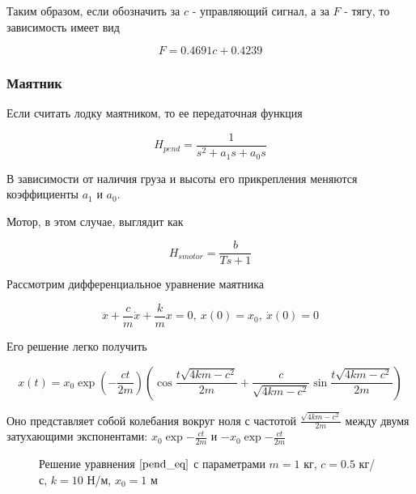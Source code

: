\documentclass[12pt,a4paper]{article}
\begin{document}
Таким образом, если обозначить за $c$ - управляющий сигнал, а за $F$ - тягу, то зависимость имеет вид

$$ F = 0.4691c + 0.4239 $$


\subsubsection{Маятник}

Если считать лодку маятником, то ее передаточная функция

$$ H_{pend} = \frac{1}{s^2 + a_1s + a_0s} $$

В зависимости от наличия груза и высоты его прикрепления меняются коэффициенты $a_1$ и $a_0$.

Мотор, в этом случае, выглядит как

$$ H_{smotor} = \frac{b}{Ts+1} $$

Рассмотрим дифференциальное уравнение маятника

\begin{equation}
	\label{pend_eq}
	\ddot{x} + \frac{c}{m}\dot{x} + \frac{k}{m}x = 0, \ x(0) = x_0, \ \dot{x}(0) = 0 
\end{equation}

Его решение легко получить

$$ x(t) = x_0 \exp\left(-\frac{ct}{2m}\right) \left( \cos\frac{t\sqrt{4km-c^2}}{2m} + \frac{c}{\sqrt{4km-c^2}} \sin\frac{t\sqrt{4km-c^2}}{2m} \right) $$

Оно представляет собой колебания вокруг ноля с частотой $\frac{\sqrt{4km-c^2}}{2m}$ между двумя затухающими экспонентами: $x_0 \exp{-\frac{ct}{2m}}$ и $-x_0 \exp{-\frac{ct}{2m}}$

\begin{figure}[h]
	\caption{Решение уравнения $\ref{pend_eq}$ с параметрами $m = 1$ кг, $c = 0.5$ кг/с, $k = 10$ Н/м, $x_0=1$ м}
\end{figure}
\end{document}
